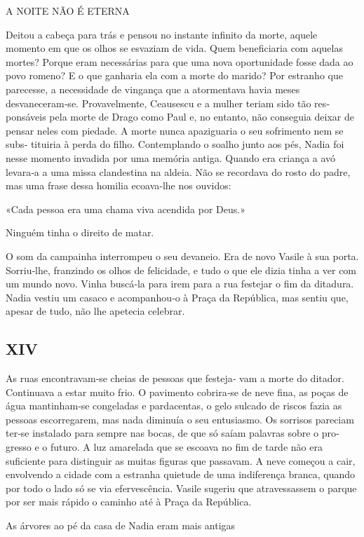 A NOITE NÃO É ETERNA

Deitou a cabeça para trás e pensou no instante infinito da morte, aquele
momento em que os olhos se esvaziam de vida. Quem beneficiaria com
aquelas mortes? Porque eram necessárias para que uma nova oportunidade
fosse dada ao povo romeno? E o que ganharia ela com a morte do marido?
Por estranho que parecesse, a necessidade de vingança que a atormentava
havia meses desvaneceram‑se. Provavelmente, Ceausescu e a mulher teriam
sido tão res‑ ponsáveis pela morte de Drago como Paul e, no entanto, não
conseguia deixar de pensar neles com piedade. A morte nunca apaziguaria
o seu sofrimento nem se subs‑ tituiria à perda do filho. Contemplando o
soalho junto aos pés, Nadia foi nesse momento invadida por uma memória
antiga. Quando era criança a avó levara‑a a uma missa clandestina na
aldeia. Não se recordava do rosto do padre, mas uma frase dessa homilia
ecoava‑lhe nos ouvidos:

«Cada pessoa era uma chama viva acendida por Deus.»

Ninguém tinha o direito de matar.

O som da campainha interrompeu o seu devaneio. Era de novo Vasile à sua
porta. Sorriu‑lhe, franzindo os olhos de felicidade, e tudo o que ele
dizia tinha a ver com um mundo novo. Vinha buscá‑la para irem para a rua
festejar o fim da ditadura. Nadia vestiu um casaco e acompanhou‑o à
Praça da República, mas sentiu que, apesar de tudo, não lhe apetecia
celebrar.

\subsection{XIV}

As ruas encontravam‑se cheias de pessoas que festeja‑ vam a morte do
ditador. Continuava a estar muito frio. O pavimento cobrira‑se de neve
fina, as poças de água mantinham‑se congeladas e pardacentas, o gelo
sulcado de riscos fazia as pessoas escorregarem, mas nada diminuía o seu
entusiasmo. Os sorrisos pareciam ter‑se instalado para sempre nas bocas,
de que só saíam palavras sobre o pro‑ gresso e o futuro. A luz amarelada
que se escoava no fim de tarde não era suficiente para distinguir as
muitas figuras que passavam. A neve começou a cair, envolvendo a cidade
com a estranha quietude de uma indiferença branca, quando por todo o
lado só se via efervescência. Vasile sugeriu que atravessassem o parque
por ser mais rápido o caminho até à Praça da República.

As árvores ao pé da casa de Nadia eram mais antigas

